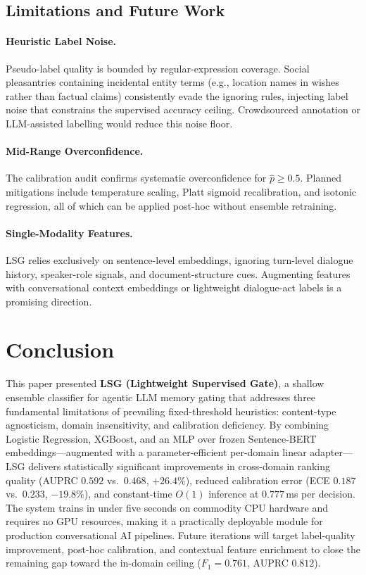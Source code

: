 \documentclass[conference]{IEEEtran}
\begin{document}
\subsection{Limitations and Future Work}

\paragraph{Heuristic Label Noise.}
Pseudo-label quality is bounded by regular-expression
coverage.
Social pleasantries containing incidental entity terms
(e.g., location names in wishes rather than factual claims)
consistently evade the ignoring rules, injecting label noise
that constrains the supervised accuracy ceiling.
Crowdsourced annotation or LLM-assisted labelling would
reduce this noise floor.

\paragraph{Mid-Range Overconfidence.}
The calibration audit confirms systematic overconfidence
for $\hat{p} \geq 0.5$.
Planned mitigations include temperature scaling, Platt
sigmoid recalibration, and isotonic regression, all of
which can be applied post-hoc without ensemble retraining.

\paragraph{Single-Modality Features.}
LSG relies exclusively on sentence-level embeddings, ignoring
turn-level dialogue history, speaker-role signals, and
document-structure cues.
Augmenting features with conversational context embeddings
or lightweight dialogue-act labels is a promising direction.

\section{Conclusion}

This paper presented \textbf{LSG (Lightweight Supervised Gate)},
a shallow ensemble classifier for agentic LLM memory gating
that addresses three fundamental limitations of prevailing
fixed-threshold heuristics: content-type agnosticism, domain
insensitivity, and calibration deficiency.
By combining Logistic Regression, XGBoost, and an MLP over
frozen Sentence-BERT embeddings---augmented with a
parameter-efficient per-domain linear adapter---LSG delivers
statistically significant improvements in cross-domain
ranking quality (AUPRC $0.592$ vs.\ $0.468$, $+26.4\%$),
reduced calibration error (ECE $0.187$ vs.\ $0.233$,
$-19.8\%$), and constant-time $O(1)$ inference at
$0.777$\,ms per decision.
The system trains in under five seconds on commodity CPU
hardware and requires no GPU resources, making it a
practically deployable module for production conversational
AI pipelines.
Future iterations will target label-quality improvement,
post-hoc calibration, and contextual feature enrichment
to close the remaining gap toward the in-domain ceiling
($F_1{=}0.761$, AUPRC $0.812$).
\end{document}

